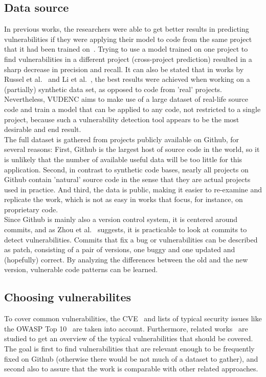\documentclass[
a4paper,
pagesize,
pdftex,
12pt,
ngerman,
fleqn,
final,
]{scrartcl}
\begin{document}
	\subsection{Data source}
	In previous works, the researchers were able to get better results in predicting vulnerabilities if they were applying their model to code from the same project that it had been trained on~\cite{Pang.2015,Dam.2017}. Trying to use a model trained on one project to find vulnerabilities in a different project (cross-project prediction) resulted in a sharp decrease in precision and recall. It can also be stated that in works by Russel et al.~\cite{Russell.2018} and Li et al.~\cite{Li.2018}, the best results were achieved when working on a (partially) synthetic data set, as opposed to code from 'real' projects.\\
	Nevertheless, VUDENC aims to make use of a large dataset of real-life source code and train a model that can be applied to any code, not restricted to a single project, because such a vulnerability detection tool appears to be the most desirable and end result.\\
	The full dataset is gathered from projects publicly available on Github, for several reasons: First, Github is the largest host of source code in the world, so it is unlikely that the number of available useful data will be too little for this application. Second, in contrast to synthetic code bases, nearly all projects on Github contain 'natural' source code in the sense that they are actual projects used in practice. And third, the data is public, making it easier to re-examine and replicate the work, which is not as easy in works that focus, for instance, on proprietary code.\\
	Since Github is mainly also a version control system, it is centered around commits, and as Zhou et al.~\cite{Zhou.2017} suggests, it is practicable to look at commits to detect vulnerabilities. Commits that fix a bug or vulnerabilities can be described as patch, consisting of a pair of versions, one buggy and one updated and (hopefully) correct. By analyzing the differences between the old and the new version, vulnerable code patterns can be learned. \\
	
	\subsection{Choosing vulnerabilites}
	To cover common vulnerabilities, the CVE~\cite{CVE} and lists of typical security issues like the OWASP Top 10~\cite{OWASPFoundation.} are taken into account. Furthermore, related works~\cite{Zhou.2017,Medeiros.2014,Yamaguchi.2012} are studied to get an overview of the typical vulnerabilities that should be covered. The goal is first to find vulnerabilities that are relevant enough to be frequently fixed on Github (otherwise there would be not much of a dataset to gather), and second also to assure that the work is comparable with other related approaches. 
	
\end{document}
